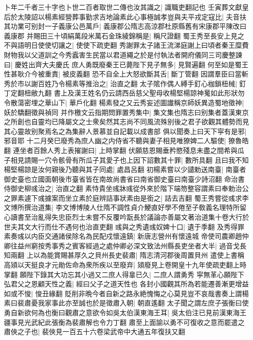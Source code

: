 卜年二千者三十字也卜世二百者取世二傳也汝其識之|{
	識職吏翻記也}
壬寅葬文獻皇后於太陵詔以楊素經營葬事勤求吉地論素此心事極誠孝豈與夫平戎定寇比|{
	夫音扶}
其功業可别封一子義康公邑萬戶|{
	義康郡公隋志高涼郡杜原縣舊有宋康郡平陳改曰義康郡}
并賜田三十頃絹萬段米萬石金珠綾錦稱是|{
	稱尺證翻}
蜀王秀至長安上見之不與語明日使使切讓之|{
	使使下疏吏翻}
秀謝罪太子諸王流涕庭謝上曰頃者秦王糜費財物我以父道訓之今秀蠧害生民當以君道繩之於是付執法者開府儀同三司慶整諫曰|{
	慶姓出齊大夫慶氏}
庶人勇既廢秦王已薨陛下見子無多|{
	見賢遍翻}
何至如是蜀王性甚耿介今被重責|{
	被皮義翻}
恐不自全上大怒欲斷其舌|{
	斷丁管翻}
因謂羣臣曰當斬秀於市以謝百姓乃令楊素等推治之|{
	治直之翻}
太子隂作偶人縛手釘心枷鎖杻械|{
	釘丁定翻杻敝九翻}
書上及漢王姓名仍云請西岳慈父聖母收楊堅楊諒神䰟如此形狀勿令散蕩密埋之華山下|{
	華戶化翻}
楊素發之又云秀妄述圖䜟稱京師妖異造蜀地徵神|{
	妖於驕翻徵與禎同}
并作檄文云指期問罪置秀集中|{
	集文集也隋志曰别集者蓋漢東京之所創也自靈均已降屬文之士衆矣然其志尚不同風流殊别後之君子欲觀其體勢而見其心靈故别聚焉名之為集辭人景慕並自記載以成書部}
俱以聞奏上曰天下寜有是邪|{
	邪音耶}
十二月癸巳廢秀為庶人幽之内侍省不聽與妻子相見唯獠婢二人驅使|{
	獠魯皓翻}
連坐者百餘人秀上表摧謝曰|{
	上時掌翻}
伏願慈恩賜垂矜愍殘息未盡之間希與瓜子相見請賜一穴令骸骨有所瓜子其愛子也上因下詔數其十罪|{
	數所具翻}
且曰我不知楊堅楊諒是汝何親後乃聽與其子同處|{
	處昌呂翻}
初楊素嘗以少譴勅送南臺|{
	南臺者御史臺也立國面朝後市臺省皆在南故尚書省曰南省御史臺曰南臺少詩沼翻}
命治書侍御史柳彧治之|{
	治直之翻}
素恃貴坐彧牀彧從外來於階下端笏整容謂素曰奉勅治公之罪素遽下彧據案而坐立素於庭辨詰事狀素由是銜之|{
	詰去吉翻}
蜀王秀嘗從彧求李文博所撰治道集|{
	李文博博陵人仕隋不調性貞介鯁直好學不倦至子敎義名理特所留心讀書至治亂得失忠臣烈士未嘗不反覆吟翫長於議論亦善屬文著治道集十卷大行於世夫其文大行而仕不遇何也治直吏翻}
彧與之秀遺彧奴婢十口|{
	遺于季翻}
及秀得罪素奏彧以内臣交通諸侯除名為民配戍懷遠鎮|{
	新唐志營州有懷遠城}
帝使司農卿趙仲卿往益州窮按秀事秀之賓客經過之處仲卿必深文致法州縣長吏坐者大半|{
	過音戈長知兩翻}
上以為能賞賜甚厚久之貝州長史裴肅|{
	隋志清河郡後周置貝州}
遣使上書稱高熲以天挺良才元勛佐命為衆所疾以至廢弃|{
	熲廢見上卷開皇十九年使疏吏翻上時掌翻}
願陛下錄其大功忘其小過又二庶人得辠已久|{
	二庶人謂勇秀}
寜無革心願陛下弘君父之恩顧天性之義|{
	經曰父子之道天性也}
各封小國觀其所為若能遷善漸更增益如或不悛|{
	悛丑緣翻}
貶削非晩今者自新之路永絶愧悔之心莫見豈不哀哉書奏上謂楊素曰裴肅憂我家事此亦至誠也於是徵肅入朝|{
	朝直遙翻}
太子聞之謂左庶子張衡曰使勇自新欲何為也衡曰觀肅之意欲令如吳太伯漢東海王耳|{
	吳太伯注已見前漢東海王疆事見光武紀此張衡為裴肅解也令力丁翻}
肅至上面諭以勇不可復收之意而罷遣之肅俠之子也|{
	裴俠見一百五十六卷梁武帝中大通五年復扶又翻}
